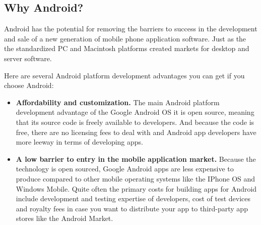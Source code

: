 \subsection{Why Android?}
Android has the potential for removing the barriers to success in the development and sale of a new generation of mobile phone application software. Just as the the standardized PC and Macintosh platforms created markets for desktop and server software.

Here are several Android platform development advantages you can get if you choose Android:

\begin{itemize}
\item \textbf{Affordability and customization.} The main Android platform development advantage of the Google Android OS it is open source, meaning that its source code is freely available to developers. And because the code is free, there are no licensing fees to deal with and Android app developers have more leeway in terms of developing apps.

\item \textbf{A low barrier to entry in the mobile application market.} Because the technology is open sourced, Google Android apps are less expensive to produce compared to other mobile operating systems like the IPhone OS and Windows Mobile. Quite often the primary costs for building apps for Android include development and testing expertise of developers, cost of test devices and royalty fees in case you want to distribute your app to third-party app stores like the Android Market.
\end{itemize}











